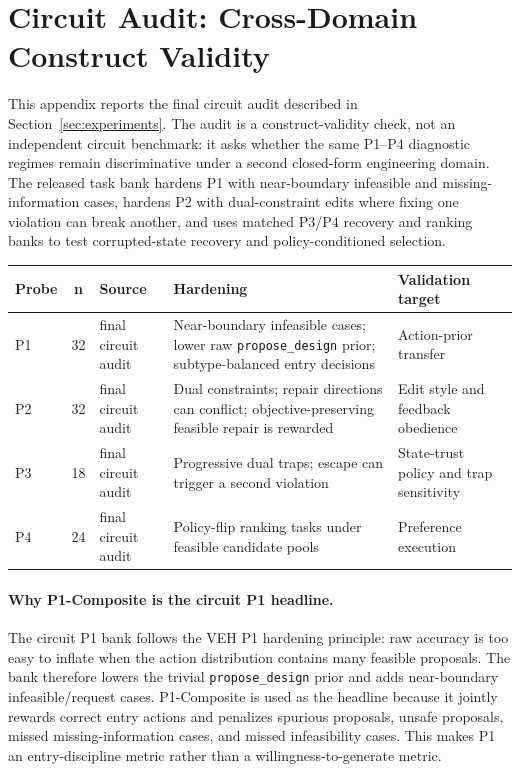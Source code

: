 \section{Circuit Audit: Cross-Domain Construct Validity}

This appendix reports the final circuit audit described in Section~\ref{sec:experiments}. The audit is a construct-validity check, not an independent circuit benchmark: it asks whether the same P1--P4 diagnostic regimes remain discriminative under a second closed-form engineering domain. The released task bank hardens P1 with near-boundary infeasible and missing-information cases, hardens P2 with dual-constraint edits where fixing one violation can break another, and uses matched P3/P4 recovery and ranking banks to test corrupted-state recovery and policy-conditioned selection.

\begin{center}
\label{tab:appendix_circuit_inventory}
\scriptsize
\setlength{\tabcolsep}{3pt}
\renewcommand{\arraystretch}{1.08}
\begin{tabularx}{\textwidth}{lcYYY}
\toprule
Probe & n & Source & Hardening & Validation target \\
\midrule
P1 & 32 & final circuit audit & Near-boundary infeasible cases; lower raw \texttt{propose\_design} prior; subtype-balanced entry decisions & Action-prior transfer \\
P2 & 32 & final circuit audit & Dual constraints; repair directions can conflict; objective-preserving feasible repair is rewarded & Edit style and feedback obedience \\
P3 & 18 & final circuit audit & Progressive dual traps; escape can trigger a second violation & State-trust policy and trap sensitivity \\
P4 & 24 & final circuit audit & Policy-flip ranking tasks under feasible candidate pools & Preference execution \\
\bottomrule
\end{tabularx}
\end{center}

\paragraph{Why P1-Composite is the circuit P1 headline.}
The circuit P1 bank follows the VEH P1 hardening principle: raw accuracy is too easy to inflate when the action distribution contains many feasible proposals. The bank therefore lowers the trivial \texttt{propose\_design} prior and adds near-boundary infeasible/request cases. P1-Composite is used as the headline because it jointly rewards correct entry actions and penalizes spurious proposals, unsafe proposals, missed missing-information cases, and missed infeasibility cases. This makes P1 an entry-discipline metric rather than a willingness-to-generate metric.

